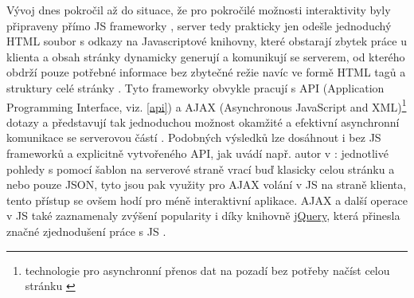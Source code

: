         Vývoj dnes pokročil až do situace, že pro pokročilé možnosti interaktivity byly připraveny přímo JS frameworky \cite{scripting-upwork}, server tedy prakticky jen odešle jednoduchý HTML soubor s odkazy na Javascriptové knihovny, které obstarají zbytek práce u klienta a obsah stránky dynamicky generují a komunikují se serverem, od kterého obdrží pouze potřebné informace bez zbytečné režie navíc ve formě HTML tagů a struktury celé stránky \cite{scripting-fasthosts}. Tyto frameworky obvykle pracují s API (Application Programming Interface, viz. \ref{api}) a AJAX (Asynchronous JavaScript and XML)\footnote{technologie pro asynchronní přenos dat na pozadí bez potřeby načíst celou stránku \cite{scripting-fasthosts}} dotazy \cite{scripting-fasthosts} a představují tak jednoduchou možnost okamžité a efektivní asynchronní komunikace se serverovou částí \cite{scripting-upwork}. Podobných výsledků lze dosáhnout i bez JS frameworků a explicitně vytvořeného API, jak uvádí např. autor v \cite{scripting-simpleis}: jednotlivé pohledy s pomocí šablon na serverové straně vrací buď klasicky celou stránku a nebo pouze JSON, tyto jsou pak využity pro AJAX volání v JS na straně klienta, tento přístup se ovšem hodí pro méně interaktivní aplikace. AJAX a další operace v JS také zaznamenaly zvýšení popularity i díky knihovně \href{http://jquery.com/}{jQuery}, která přinesla značné zjednodušení práce s JS \cite{scripting-upwork}.
        
